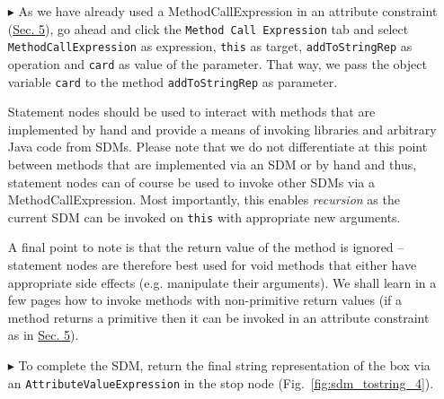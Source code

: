 \begin{itemize}
\item[$\blacktriangleright$] As we have already used a MethodCallExpression in an attribute constraint (\hyperlink{sec:growBox}{Sec. 5}), go ahead and click the
\texttt{Method Call Expression} tab and select \texttt{MethodCallExpression} as expression, \texttt{this} as target, \texttt{addToStringRep} as operation and
\texttt{card} as value of the parameter. That way, we pass the object variable \texttt{card} to the method
\texttt{addToStringRep} as parameter.

Statement nodes should be used to interact with methods that are implemented by hand and provide a means of invoking libraries and arbitrary Java code from
SDMs. Please note that we do not differentiate at this point between methods that are implemented via an SDM or by hand and thus, statement nodes can of course
be used to invoke other SDMs via a MethodCallExpression. Most importantly, this enables \emph{recursion} as the current SDM can be invoked on \texttt{this} with
appropriate new arguments.

A final point to note is that the return value of the method is ignored -- statement nodes are therefore best used for void methods that either have appropriate
side effects (e.g. manipulate their arguments). We shall learn in a few pages how to invoke methods with non-primitive return values (if a method returns a
primitive then it can be invoked in an attribute constraint as in \hyperlink{sec:growBox}{Sec. 5}). %


\item[$\blacktriangleright$] To complete the SDM, return the final string representation of the box via an \texttt{AttributeValueExpression} in the stop node
(Fig.~\ref{fig:sdm_tostring_4}).


\begin{figure}[ht]
   \centering
      \qquad
      \caption{}
\end{figure}
\FloatBarrier


\end{itemize}
